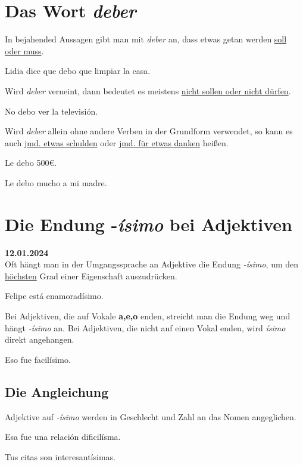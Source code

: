 \section{Das Wort \textit{deber}}
In bejahended Aussagen gibt man mit \textit{deber} an, dass 
etwas getan werden \underline{soll oder muss}.
\begin{ejemplos}
    \item Lidia dice que debo que limpiar la casa.
\end{ejemplos}
Wird \textit{deber} verneint, dann bedeutet es meistens 
\underline{nicht sollen oder nicht dürfen}.
\begin{ejemplos}
    \item No debo ver la televisi\'on.
\end{ejemplos}
Wird \textit{deber} allein ohne andere Verben in der Grundform
verwendet, so kann es auch \underline{jmd. etwas schulden} oder
\underline{jmd. für etwas danken} heißen.
\begin{ejemplos}
    \item Le debo 500€.
    \item Le debo mucho a mi madre. 
\end{ejemplos}

\section{Die Endung -\textit{\'isimo} bei Adjektiven}
\textbf{12.01.2024}\\
Oft hängt man in der Umgangssprache an Adjektive
die Endung \textit{-\'isimo}, um den 
\underline{höchsten} Grad einer Eigenschaft auszudrücken.
\begin{ejemplos}
    \item Felipe est\'a enamorad\'isimo.
\end{ejemplos}
Bei Adjektiven, die auf Vokale \textbf{a,e,o} enden,
streicht man die Endung weg und hängt \textit{-\'isimo}
an. Bei Adjektiven, die nicht auf einen Vokal enden,
wird \textit{\'isimo} direkt angehangen.
\begin{ejemplos}
    \item Eso fue facil\'isimo.
\end{ejemplos}
\subsection*{Die Angleichung}
Adjektive auf \textit{-\'isimo} werden in Geschlecht 
und Zahl an das Nomen angeglichen.
\begin{ejemplos}
    \item Esa fue una relaci\'on dificil\'isma.
    \item Tus citas son interesant\'isimas.
\end{ejemplos}
